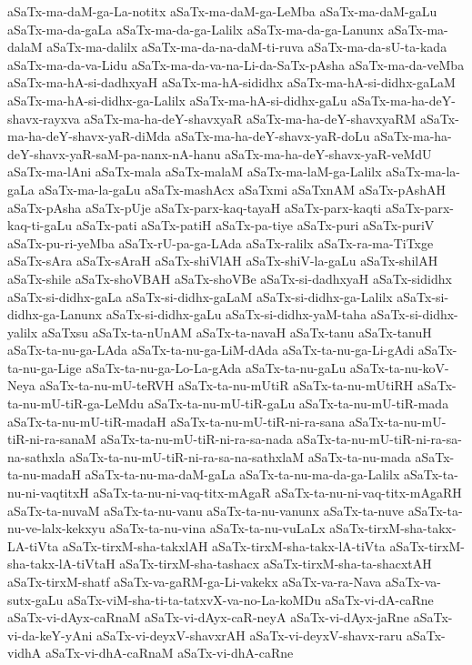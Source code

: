 {aSaTx-ma-daM-ga-La-notitx
aSaTx-ma-daM-ga-LeMba
aSaTx-ma-daM-gaLu
aSaTx-ma-da-gaLa
aSaTx-ma-da-ga-Lalilx
aSaTx-ma-da-ga-Lanunx
aSaTx-ma-dalaM
aSaTx-ma-dalilx
aSaTx-ma-da-na-daM-ti-ruva
aSaTx-ma-da-sU-ta-kada
aSaTx-ma-da-va-Lidu
aSaTx-ma-da-va-na-Li-da-SaTx-pAsha
aSaTx-ma-da-veMba
aSaTx-ma-hA-si-dadhxyaH
aSaTx-ma-hA-sididhx
aSaTx-ma-hA-si-didhx-gaLaM
aSaTx-ma-hA-si-didhx-ga-Lalilx
aSaTx-ma-hA-si-didhx-gaLu
aSaTx-ma-ha-deY-shavx-rayxva
aSaTx-ma-ha-deY-shavxyaR
aSaTx-ma-ha-deY-shavxyaRM
aSaTx-ma-ha-deY-shavx-yaR-diMda
aSaTx-ma-ha-deY-shavx-yaR-doLu
aSaTx-ma-ha-deY-shavx-yaR-saM-pa-nanx-nA-hanu
aSaTx-ma-ha-deY-shavx-yaR-veMdU
aSaTx-ma-lAni
aSaTx-mala
aSaTx-malaM
aSaTx-ma-laM-ga-Lalilx
aSaTx-ma-la-gaLa
aSaTx-ma-la-gaLu
aSaTx-mashAcx
aSaTxmi
aSaTxnAM
aSaTx-pAshAH
aSaTx-pAsha
aSaTx-pUje
aSaTx-parx-kaq-tayaH
aSaTx-parx-kaqti
aSaTx-parx-kaq-ti-gaLu
aSaTx-pati
aSaTx-patiH
aSaTx-pa-tiye
aSaTx-puri
aSaTx-puriV
aSaTx-pu-ri-yeMba
aSaTx-rU-pa-ga-LAda
aSaTx-ralilx
aSaTx-ra-ma-TiTxge
aSaTx-sAra
aSaTx-sAraH
aSaTx-shiVlAH
aSaTx-shiV-la-gaLu
aSaTx-shilAH
aSaTx-shile
aSaTx-shoVBAH
aSaTx-shoVBe
aSaTx-si-dadhxyaH
aSaTx-sididhx
aSaTx-si-didhx-gaLa
aSaTx-si-didhx-gaLaM
aSaTx-si-didhx-ga-Lalilx
aSaTx-si-didhx-ga-Lanunx
aSaTx-si-didhx-gaLu
aSaTx-si-didhx-yaM-taha
aSaTx-si-didhx-yalilx
aSaTxsu
aSaTx-ta-nUnAM
aSaTx-ta-navaH
aSaTx-tanu
aSaTx-tanuH
aSaTx-ta-nu-ga-LAda
aSaTx-ta-nu-ga-LiM-dAda
aSaTx-ta-nu-ga-Li-gAdi
aSaTx-ta-nu-ga-Lige
aSaTx-ta-nu-ga-Lo-La-gAda
aSaTx-ta-nu-gaLu
aSaTx-ta-nu-koV-Neya
aSaTx-ta-nu-mU-teRVH
aSaTx-ta-nu-mUtiR
aSaTx-ta-nu-mUtiRH
aSaTx-ta-nu-mU-tiR-ga-LeMdu
aSaTx-ta-nu-mU-tiR-gaLu
aSaTx-ta-nu-mU-tiR-mada
aSaTx-ta-nu-mU-tiR-madaH
aSaTx-ta-nu-mU-tiR-ni-ra-sana
aSaTx-ta-nu-mU-tiR-ni-ra-sanaM
aSaTx-ta-nu-mU-tiR-ni-ra-sa-nada
aSaTx-ta-nu-mU-tiR-ni-ra-sa-na-sathxla
aSaTx-ta-nu-mU-tiR-ni-ra-sa-na-sathxlaM
aSaTx-ta-nu-mada
aSaTx-ta-nu-madaH
aSaTx-ta-nu-ma-daM-gaLa
aSaTx-ta-nu-ma-da-ga-Lalilx
aSaTx-ta-nu-ni-vaqtitxH
aSaTx-ta-nu-ni-vaq-titx-mAgaR
aSaTx-ta-nu-ni-vaq-titx-mAgaRH
aSaTx-ta-nuvaM
aSaTx-ta-nu-vanu
aSaTx-ta-nu-vanunx
aSaTx-ta-nuve
aSaTx-ta-nu-ve-lalx-kekxyu
aSaTx-ta-nu-vina
aSaTx-ta-nu-vuLaLx
aSaTx-tirxM-sha-takx-LA-tiVta
aSaTx-tirxM-sha-takxlAH
aSaTx-tirxM-sha-takx-lA-tiVta
aSaTx-tirxM-sha-takx-lA-tiVtaH
aSaTx-tirxM-sha-tashacx
aSaTx-tirxM-sha-ta-shacxtAH
aSaTx-tirxM-shatf
aSaTx-va-gaRM-ga-Li-vakekx
aSaTx-va-ra-Nava
aSaTx-va-sutx-gaLu
aSaTx-viM-sha-ti-ta-tatxvX-va-no-La-koMDu
aSaTx-vi-dA-caRne
aSaTx-vi-dAyx-caRnaM
aSaTx-vi-dAyx-caR-neyA
aSaTx-vi-dAyx-jaRne
aSaTx-vi-da-keY-yAni
aSaTx-vi-deyxV-shavxrAH
aSaTx-vi-deyxV-shavx-raru
aSaTx-vidhA
aSaTx-vi-dhA-caRnaM
aSaTx-vi-dhA-caRne
}

